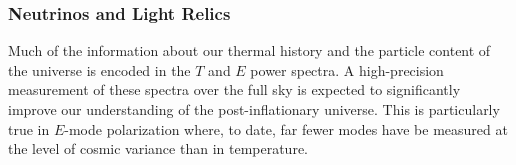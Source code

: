 %
%
%
\vspace{-0.15in}

\subsubsection{Neutrinos and Light Relics}

\vspace{-0.05in}

Much of the information about our thermal history and the particle content of the universe is encoded in the $T$ and $E$ power spectra.  
A high-precision measurement of these spectra over the full sky is expected to significantly improve our understanding of the post-inflationary 
universe.  This is particularly true in $E$-mode polarization where, to date, far fewer modes have be measured at the level of cosmic variance than in temperature.

